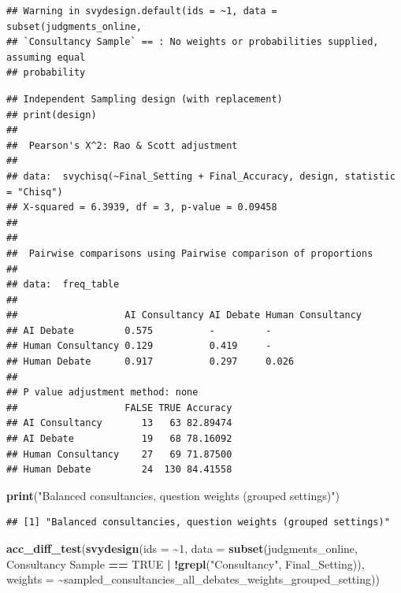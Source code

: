 \documentclass[
]{article}
\newenvironment{Shaded}{\begin{snugshade}}{\end{snugshade}}
\newcommand{\AttributeTok}[1]{\textcolor[rgb]{0.13,0.29,0.53}{#1}}
\newcommand{\ConstantTok}[1]{\textcolor[rgb]{0.56,0.35,0.01}{#1}}
\newcommand{\DecValTok}[1]{\textcolor[rgb]{0.00,0.00,0.81}{#1}}
\newcommand{\FunctionTok}[1]{\textcolor[rgb]{0.13,0.29,0.53}{\textbf{#1}}}
\newcommand{\NormalTok}[1]{#1}
\newcommand{\SpecialCharTok}[1]{\textcolor[rgb]{0.81,0.36,0.00}{\textbf{#1}}}
\newcommand{\StringTok}[1]{\textcolor[rgb]{0.31,0.60,0.02}{#1}}
\begin{document}
\begin{verbatim}
## Warning in svydesign.default(ids = ~1, data = subset(judgments_online,
## `Consultancy Sample` == : No weights or probabilities supplied, assuming equal
## probability
\end{verbatim}

\begin{verbatim}
## Independent Sampling design (with replacement)
## print(design)
## 
##  Pearson's X^2: Rao & Scott adjustment
## 
## data:  svychisq(~Final_Setting + Final_Accuracy, design, statistic = "Chisq")
## X-squared = 6.3939, df = 3, p-value = 0.09458
## 
## 
##  Pairwise comparisons using Pairwise comparison of proportions 
## 
## data:  freq_table 
## 
##                   AI Consultancy AI Debate Human Consultancy
## AI Debate         0.575          -         -                
## Human Consultancy 0.129          0.419     -                
## Human Debate      0.917          0.297     0.026            
## 
## P value adjustment method: none 
##                   FALSE TRUE Accuracy
## AI Consultancy       13   63 82.89474
## AI Debate            19   68 78.16092
## Human Consultancy    27   69 71.87500
## Human Debate         24  130 84.41558
\end{verbatim}

\begin{Shaded}
\begin{Highlighting}[]
\FunctionTok{print}\NormalTok{(}\StringTok{"Balanced consultancies, question weights (grouped settings)"}\NormalTok{)}
\end{Highlighting}
\end{Shaded}

\begin{verbatim}
## [1] "Balanced consultancies, question weights (grouped settings)"
\end{verbatim}

\begin{Shaded}
\begin{Highlighting}[]
\FunctionTok{acc\_diff\_test}\NormalTok{(}\FunctionTok{svydesign}\NormalTok{(}\AttributeTok{ids =} \SpecialCharTok{\textasciitilde{}}\DecValTok{1}\NormalTok{, }\AttributeTok{data =} \FunctionTok{subset}\NormalTok{(judgments\_online, }\StringTok{\textasciigrave{}}\AttributeTok{Consultancy Sample}\StringTok{\textasciigrave{}} \SpecialCharTok{==} \ConstantTok{TRUE} \SpecialCharTok{|} \SpecialCharTok{!}\FunctionTok{grepl}\NormalTok{(}\StringTok{"Consultancy"}\NormalTok{, Final\_Setting)), }\AttributeTok{weights =} \SpecialCharTok{\textasciitilde{}}\NormalTok{sampled\_consultancies\_all\_debates\_weights\_grouped\_setting))}
\end{Highlighting}
\end{Shaded}
\end{document}
